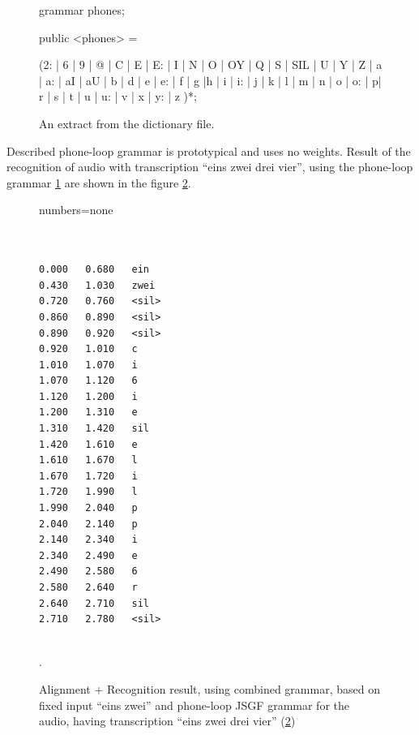 \begin{figure}[htbp]
%  
%  

grammar phones;

public <phones> = \begin{IPA}(2: | 6 | 9 | @ | C | E | E: | I | N | O | OY | Q |
S | SIL | U | Y | Z  | a | a: | aI | aU | b | d | e |  e: | f | g |h | i | i: |
j | k | l | m | n | o | o: | p| r | s |  t | u | u: | v | x | y: | z
)*;\end{IPA}


 \caption{An extract from the dictionary file.}
  \label{fig:phone_loop}
\end {figure}

Described phone-loop grammar is prototypical and uses no weights. Result of the
recognition of audio with transcription ``eins zwei drei vier'', using the
phone-loop grammar   \ref{fig:phone_loop} are shown in the figure
\ref{fig:phone_loop_res}.


\begin{figure}[htbp]
 \centering 

  {numbers=none} 
  
\begin{center}
\begin{lstlisting}[style=nonumbers]


0.000	0.680	ein
0.430	1.030	zwei
0.720	0.760	<sil>
0.860	0.890	<sil>
0.890	0.920	<sil>
0.920	1.010	c
1.010	1.070	i
1.070	1.120	6
1.120	1.200	i
1.200	1.310	e
1.310	1.420	sil
1.420	1.610	e
1.610	1.670	l
1.670	1.720	i
1.720	1.990	l
1.990	2.040	p
2.040	2.140	p
2.140	2.340	i
2.340	2.490	e
2.490	2.580	6
2.580	2.640	r
2.640	2.710	sil
2.710	2.780	<sil>


\end{lstlisting}
\end{center}
 \caption{Alignment + Recognition result, using combined grammar, based on
 fixed input ``eins zwei'' and phone-loop JSGF grammar for the audio, having
 transcription ``eins zwei drei vier'' (\ref{fig:phone_loop_res})}.
 
  \label{fig:phone_loop_res}
\end {figure}


